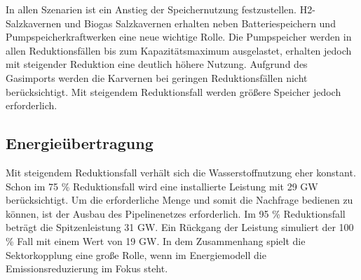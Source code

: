In allen Szenarien ist ein Anstieg der Speichernutzung festzustellen. H2-Salzkavernen und Biogas Salzkavernen erhalten neben Batteriespeichern und Pumpspeicherkraftwerken eine neue wichtige Rolle. Die Pumpspeicher werden in allen Reduktionsfällen bis zum Kapazitätsmaximum ausgelastet, erhalten jedoch mit steigender Reduktion eine deutlich höhere Nutzung. Aufgrund des Gasimports werden die Karvernen bei geringen Reduktionsfällen nicht berücksichtigt. Mit steigendem Reduktionsfall werden größere Speicher jedoch erforderlich.



\subsection{Energieübertragung}
Mit steigendem Reduktionsfall verhält sich die Wasserstoffnutzung eher konstant. Schon im 75 \% Reduktionsfall wird eine installierte Leistung mit 29 GW berücksichtigt. Um die erforderliche Menge und somit die Nachfrage bedienen zu können, ist der Ausbau des Pipelinenetzes erforderlich. Im 95 \% Reduktionsfall beträgt die Spitzenleistung 31 GW. Ein Rückgang der Leistung simuliert der 100 \% Fall mit einem Wert von 19 GW. In dem Zusammenhang spielt die Sektorkopplung eine große Rolle, wenn im Energiemodell die Emissionsreduzierung im Fokus steht. 




